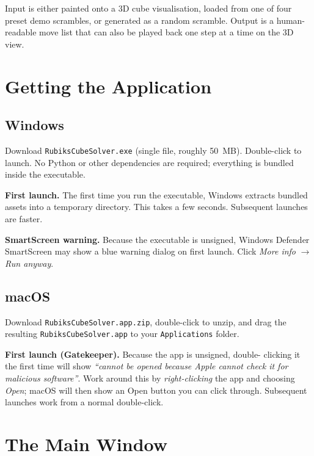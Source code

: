 \documentclass[11pt,a4paper]{article}
\begin{document}
Input is either painted onto a 3D cube visualisation, loaded from one of
four preset demo scrambles, or generated as a random scramble. Output is
a human-readable move list that can also be played back one step at a
time on the 3D view.

\section{Getting the Application}

\subsection{Windows}

Download \texttt{RubiksCubeSolver.exe} (single file, roughly 50~MB).
Double-click to launch. No Python or other dependencies are required;
everything is bundled inside the executable.

\textbf{First launch.} The first time you run the executable, Windows
extracts bundled assets into a temporary directory. This takes a few
seconds. Subsequent launches are faster.

\textbf{SmartScreen warning.} Because the executable is unsigned, Windows
Defender SmartScreen may show a blue warning dialog on first launch.
Click \textit{More info} $\to$ \textit{Run anyway}.

\subsection{macOS}

Download \texttt{RubiksCubeSolver.app.zip}, double-click to unzip, and
drag the resulting \texttt{RubiksCubeSolver.app} to your
\texttt{Applications} folder.

\textbf{First launch (Gatekeeper).} Because the app is unsigned, double-
clicking it the first time will show \emph{``cannot be opened because
Apple cannot check it for malicious software''}. Work around this by
\emph{right-clicking} the app and choosing \textit{Open}; macOS will
then show an Open button you can click through. Subsequent launches work
from a normal double-click.

\section{The Main Window}
\end{document}
